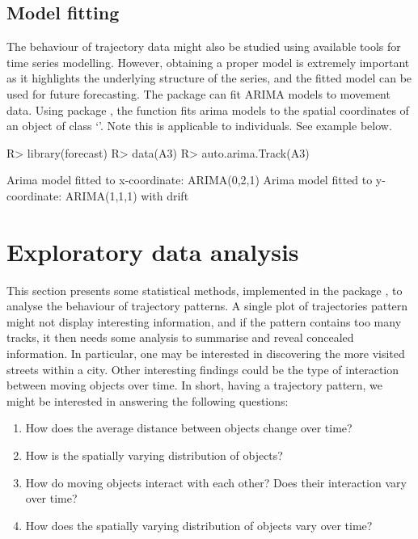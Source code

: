\documentclass[article]{jss}
\newcommand{\class}[1]{`\code{#1}'}
\begin{document}
 \subsection{Model fitting}
  The behaviour of trajectory data might also be studied using available tools for time series modelling. However, obtaining a proper model is extremely important as it highlights the
  underlying structure of the series, and the fitted model can be used for future forecasting. The  package
   can fit ARIMA models to movement data. Using  package , the function  fits arima models to the spatial coordinates of an object of class \class{Track}. Note this is applicable to individuals. See example below.

\begin{Schunk}
\begin{Sinput}
R> library(forecast)
R> data(A3)
R> auto.arima.Track(A3)
\end{Sinput}
\begin{Soutput}
Arima model fitted to x-coordinate: ARIMA(0,2,1) 
Arima model fitted to y-coordinate: ARIMA(1,1,1) with drift
\end{Soutput}
\end{Schunk}

\section{Exploratory data analysis} \label{sec:explo}
  This section presents some statistical methods, implemented in the  package , to analyse the behaviour of trajectory patterns. A single plot of trajectories pattern might not display interesting information, and if the pattern contains too many tracks, it then needs some analysis to summarise and reveal concealed information. In particular, one may be interested in discovering the more visited streets within a city. Other interesting findings could be the type of interaction between moving objects over time. In short, having a trajectory pattern, we might be interested in answering the following questions:
  \begin{enumerate}
  \item How does the average distance between objects change over time?
  \item How is the spatially varying distribution of objects?
  \item How do moving objects interact with each other? Does their interaction vary over time?
  \item How does the spatially varying distribution of objects vary over time?
  \end{enumerate}
\end{document}
